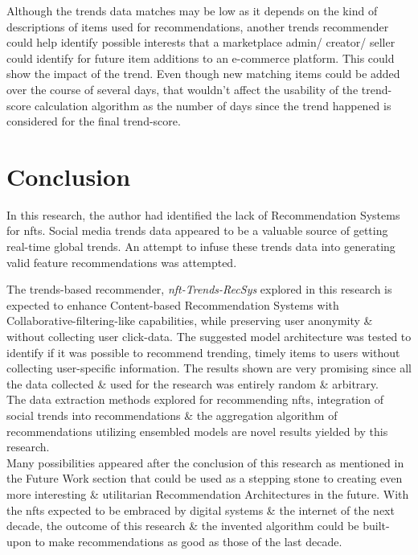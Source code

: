 \documentclass[manuscript,natbib=false, anonymous]{acmart}
\begin{document}

Although the trends data matches may be low as it depends on the kind of descriptions of items used for recommendations, another trends recommender could help identify possible interests that a marketplace admin/ creator/ seller could identify for future item additions to an e-commerce platform. This could show the impact of the trend. Even though new matching items could be added over the course of several days, that wouldn't affect the usability of the trend-score calculation algorithm as the number of days since the trend happened is considered for the final trend-score.\\

\section{Conclusion}
In this research, the author had identified the lack of Recommendation Systems for \gls{nft}s. Social media trends data appeared to be a valuable source of getting real-time global trends. An attempt to infuse these trends data into generating valid feature recommendations was attempted.

The trends-based recommender, \textit{\gls{nft}-Trends-RecSys} explored in this research is expected to enhance Content-based Recommendation Systems with Collaborative-filtering-like capabilities, while preserving user anonymity \& without collecting user click-data. The suggested model architecture was tested to identify if it was possible to recommend trending, timely items to users without collecting user-specific information. The results shown are very promising since all the data collected \& used for the research was entirely random \& arbitrary.\\

The data extraction methods explored for recommending \gls{nft}s, integration of social trends into recommendations \& the aggregation algorithm of recommendations utilizing ensembled models are novel results yielded by this research.\\

Many possibilities appeared after the conclusion of this research as mentioned in the Future Work section that could be used as a stepping stone to creating even more interesting \& utilitarian Recommendation Architectures in the future. With the \gls{nft}s expected to be embraced by digital systems \& the internet of the next decade, the outcome of this research \& the invented algorithm could be built-upon to make recommendations as good as those of the last decade.
\end{document}
